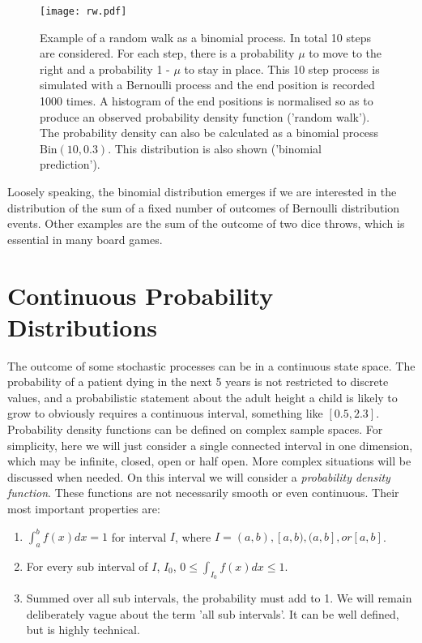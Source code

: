 \begin{figure}[!ht]
\begin{center}
\texttt{[image: rw.pdf]}
\end{center}
\label{fig-rw}
\caption{Example of a random walk as a binomial process. In total 10 steps are considered. For each step, there is a probability $\mu$ to move to the right and a probability 1 - $\mu$ to stay in place. This 10 step process is simulated with a Bernoulli process and the end position is recorded 1000 times. A histogram of the end positions is normalised so as to produce an observed probability density function ('random walk'). The probability density can also be calculated as a binomial process $\mbox{Bin}(10,0.3)$. This distribution is also shown ('binomial prediction').}
 \end{figure}

Loosely speaking, the binomial distribution emerges if we are interested in the distribution of the sum of a fixed number of outcomes of Bernoulli distribution events.
Other examples are the sum of the outcome of two dice throws, which is essential in many board games.


\section{Continuous Probability Distributions}

The outcome of some stochastic processes can be in a continuous state space. The probability of a patient dying in the next 5 years is not  restricted to
discrete values, and a probabilistic statement about the adult height a child is likely to grow to obviously requires a continuous interval, something like
$[0.5, 2.3]$. Probability density functions can be defined on complex sample spaces. For simplicity, here we will just consider a single connected interval in one dimension,
which may be infinite, closed, open or half open. More complex situations will be discussed when needed.
On this interval we will consider a \emph{probability density function}. These functions are not necessarily smooth or even continuous. Their most important properties
are:

\begin{enumerate}
\item $\int^b_a f(x) d x = 1$ for interval $I$, where $I = (a,b), [a, b), (a, b], or [a,b]$.
\item For every sub interval of $I$, $I_0$, $0 \le \int_{I_0} f(x)dx \le 1$.
\item Summed over all sub intervals, the probability must add to 1. We will remain deliberately vague about the term 'all sub intervals'. It can be well defined,
      but is highly technical.
\end{enumerate}

